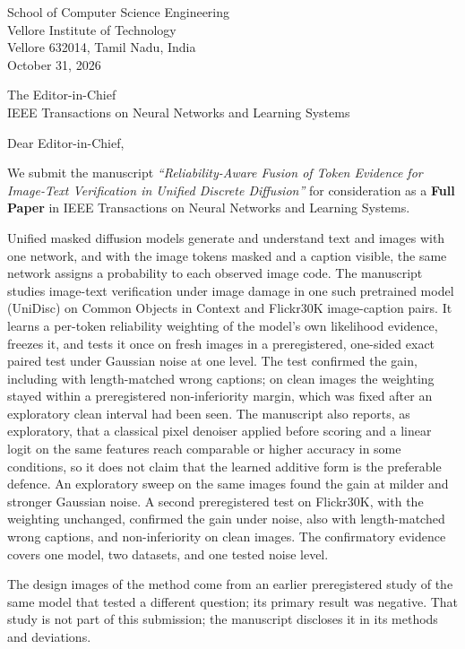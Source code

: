 \documentclass[11pt]{article}
\begin{document}
\begin{flushright}
School of Computer Science Engineering\\
Vellore Institute of Technology\\
Vellore 632014, Tamil Nadu, India\\[4pt]
October 31, 2026
\end{flushright}

The Editor-in-Chief\\
IEEE Transactions on Neural Networks and Learning Systems

Dear Editor-in-Chief,

We submit the manuscript \emph{``Reliability-Aware Fusion of Token Evidence for Image-Text Verification in Unified Discrete
Diffusion''} for consideration as a \textbf{Full Paper} in IEEE Transactions on Neural Networks and Learning Systems.

Unified masked diffusion models generate and understand text and images with one network, and with the image tokens masked and a
caption visible, the same network assigns a probability to each observed image code. The manuscript studies image-text verification
under image damage in one such pretrained model (UniDisc) on Common Objects in Context and Flickr30K image-caption pairs. It learns a per-token
reliability weighting of the model's own likelihood evidence, freezes it, and tests it once on fresh images in a preregistered,
one-sided exact paired test under Gaussian noise at one level. The test confirmed the gain, including with length-matched wrong captions;
on clean images the weighting stayed within a preregistered non-inferiority margin, which was fixed after an exploratory clean interval
had been seen. The manuscript also reports, as exploratory, that a classical pixel denoiser applied before scoring and a linear logit on
the same features reach comparable or higher accuracy in some conditions, so it does not claim that the learned additive form is the
preferable defence. An exploratory sweep on the same images found the gain at milder and stronger Gaussian noise. A second preregistered test on Flickr30K, with the weighting unchanged, confirmed the gain under noise, also with length-matched wrong captions, and non-inferiority on clean images. The confirmatory evidence covers one model, two datasets, and one tested noise level.

The design images of the method come from an earlier preregistered study of the same model that tested a different question; its primary result was negative. That study is not part of this submission; the manuscript discloses it in its methods and deviations.
\end{document}
